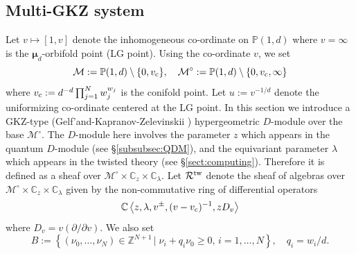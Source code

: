 \documentclass[11pt]{amsart}
\theoremstyle{definition} %
\theoremstyle{remark} %
\newcommand{\CC}{\mathbb C}
\newcommand{\PP}{\mathbb P}
\newcommand{\ZZ}{\mathbb Z}
\newcommand{\tw}{{\rm tw}}
\def\parfrac#1#2{\frac{\partial #1}{\partial #2}}
\newcommand{\bmu}{\boldsymbol{\mu}}
\newcommand{\A}{\mathbb{A}}
\newcommand{\cM}{\mathcal{M}}
\newcommand{\cMo}{\mathcal{M}^\circ}
\newcommand{\cR}{\mathcal{R}}
\newcommand{\vc}{v_{\rm c}}
\begin{document}
\subsection{Multi-GKZ system} 
\label{subsec:mGKZ}
Let $v\mapsto [1,v]$ denote 
the inhomogeneous co-ordinate on $\PP(1,d)$ 
where $v=\infty$ is the $\bmu_d$-orbifold point (LG point). 
Using the co-ordinate $v$, we set  
\[
\cM := \PP(1,d) \setminus \{0,\vc \}, 
\quad 
\cMo := \PP(1,d) \setminus \{0, \vc, \infty\}  
\]
where $\vc := d^{-d} \prod_{j=1}^N w_j^{w_j}$ is the 
conifold point.  
Let $u := v^{-1/d}$ denote the uniformizing co-ordinate 
centered at the LG point. 
In this section we introduce a GKZ-type 
(Gelf'and-Kapranov-Zelevinskii \cite{GKZ:hypergeom}) 
hypergeometric $D$-module over the base $\cMo$. 
The $D$-module here involves the parameter $z$ 
which appears in the quantum $D$-module (see \S \ref{subsubsec:QDM}),  
and the equivariant parameter $\lambda$ which appears in 
the twisted theory (see \S \ref{sect:computing}). 
Therefore it is defined as a sheaf over $\cMo\times \CC_z \times \CC_\lambda$. 
Let $\cR^\tw$ denote the sheaf of algebras over 
$\cMo\times \CC_z\times \CC_\lambda$ given by 
the non-commutative ring of differential operators 
\[
\CC \left\langle 
z, \lambda, v^\pm, (v-\vc)^{-1}, z D_v 
\right \rangle 
\]
where $D_v = v (\partial/\partial v)$. 
We also set 
\[ 
B:= \left\{
(\nu_0,\dots,\nu_N)\in \ZZ^{N+1}\,\big |\;  
\nu_i + q_i \nu_0 \ge 0,\, i= 1,\dots, N 
\right \}, \quad 
q_i = w_i/d. 
\] 
\end{document}
